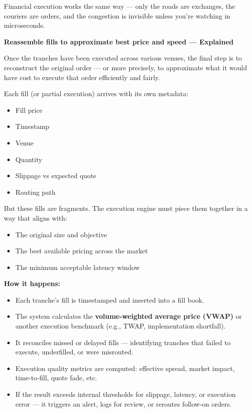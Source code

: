 Financial execution works the same way — only the roads are exchanges, the couriers are orders, and the congestion is 
invisible unless you're watching in microseconds.






\textbf{Reassemble fills to approximate best price and speed — Explained}

Once the tranches have been executed across various venues, the final step is to reconstruct the original order — or 
more precisely, to approximate what it would have cost to execute that order efficiently and fairly.

Each fill (or partial execution) arrives with its own metadata:

\begin{itemize}
  \item Fill price
  \item Timestamp
  \item Venue
  \item Quantity
  \item Slippage vs expected quote
  \item Routing path
\end{itemize}

But these fills are fragments. The execution engine must piece them together in a way that aligns with:
\begin{itemize}
  \item The original size and objective
  \item The best available pricing across the market
  \item The minimum acceptable latency window
\end{itemize}

\textbf{How it happens:}

\begin{itemize}
  \item Each tranche’s fill is timestamped and inserted into a fill book.
  \item The system calculates the \textbf{volume-weighted average price (VWAP)} or another execution benchmark 
  (e.g., TWAP, implementation shortfall).
  \item It reconciles missed or delayed fills — identifying tranches that failed to execute, underfilled, or 
  were misrouted.
  \item Execution quality metrics are computed: effective spread, market impact, time-to-fill, quote fade, etc.
  \item If the result exceeds internal thresholds for slippage, latency, or execution error — it triggers an 
  alert, logs for review, or reroutes follow-on orders.
\end{itemize}

